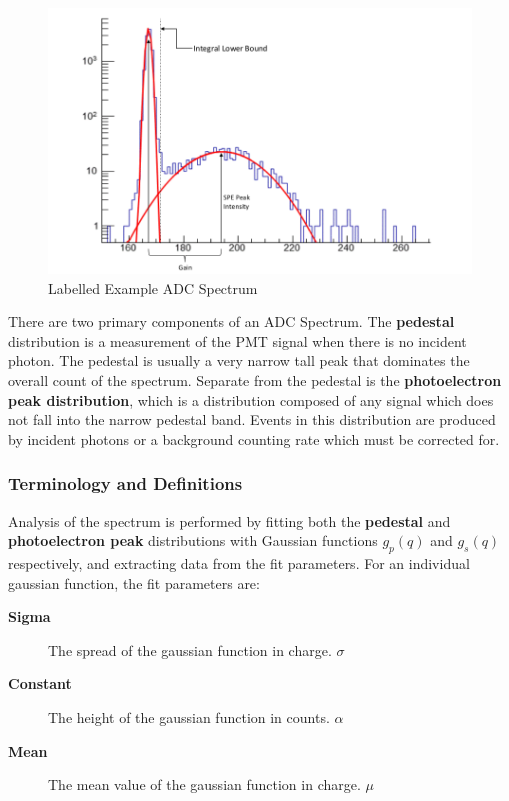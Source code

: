\documentclass[twoside,letterpaper]{refart}
\newcommand{\picwidth}{0.7 \textwidth}
\begin{document}
\begin{figure}[!htpb]\centering	
	\includegraphics[width=\picwidth]{images/adcSpectrum}
	\caption{Labelled Example ADC Spectrum\label{adcSpectrum}}
\end{figure}

\FloatBarrier

There are two primary components of an ADC Spectrum. The \textbf{pedestal} distribution is a measurement of the PMT signal when there is no incident photon. The pedestal is usually a very narrow tall peak that dominates the overall count of the spectrum. Separate from the pedestal is the \textbf{photoelectron peak distribution}, which is a distribution composed of any signal which does not fall into the narrow pedestal band. Events in this distribution are produced by incident photons or a background counting rate which must be corrected for.

\subsubsection{Terminology and Definitions}

Analysis of the spectrum is performed by fitting both the \textbf{pedestal} and \textbf{photoelectron peak} distributions with Gaussian functions $g_p(q)$ and $g_s(q)$ respectively, and extracting data from the fit parameters. For an individual gaussian function, the fit parameters are:

\begin{description}
	
\item[\textbf{Sigma}]

The spread of the gaussian function in charge. $\sigma$

\item[\textbf{Constant}]

The height of the gaussian function in counts. $\alpha$

\item[\textbf{Mean}] The mean value of the gaussian function in charge. $\mu$

\end{description}
\end{document}
